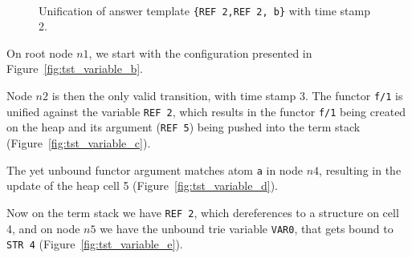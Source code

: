 \begin{figure}
   \qquad
    \\
   
   \caption{Unification of answer template \texttt{\{REF~2,REF~2,~b\}} with time stamp 2.}
   \label{fig:tst_variable}
\end{figure}

On root node $n1$, we start with the configuration presented in Figure~\ref{fig:tst_variable_b}.

Node $n2$ is then the only valid transition, with time stamp 3.
The functor \texttt{f/1} is unified against the variable \texttt{REF 2},
which results in the functor \texttt{f/1} being created on the heap
and its argument (\texttt{REF 5}) being pushed into the term stack
(Figure~\ref{fig:tst_variable_c}).

The yet unbound functor argument matches atom \texttt{a} in node $n4$,
resulting in the update of the heap cell 5 (Figure~\ref{fig:tst_variable_d}).

Now on the term stack we have \texttt{REF 2}, which dereferences to
a structure on cell 4, and on node $n5$ we have the unbound trie variable
\texttt{VAR0}, that gets bound to \texttt{STR 4} (Figure~\ref{fig:tst_variable_e}).

